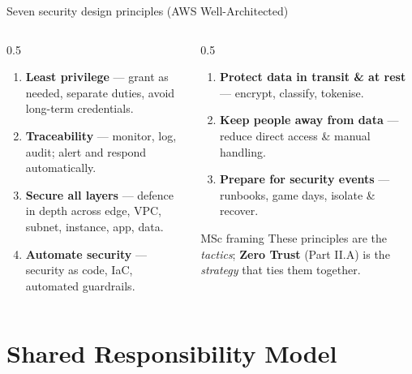 \documentclass[aspectratio=169,10pt]{beamer}
\newcommand{\term}[1]{{\color{awsink}\textbf{#1}}}
\begin{document}
\begin{frame}{Seven security design principles (AWS Well-Architected)}
  \footnotesize
  \begin{columns}[T]
    \begin{column}{0.5\textwidth}
      \begin{enumerate}\setlength\itemsep{2pt}
        \item \term{Least privilege} --- grant as needed, separate duties, avoid long-term credentials.
        \item \term{Traceability} --- monitor, log, audit; alert and respond automatically.
        \item \term{Secure all layers} --- defence in depth across edge, VPC, subnet, instance, app, data.
        \item \term{Automate security} --- security as code, IaC, automated guardrails.
      \end{enumerate}
    \end{column}
    \begin{column}{0.5\textwidth}
      \begin{enumerate}\setlength\itemsep{2pt}\setcounter{enumi}{4}
        \item \term{Protect data in transit \& at rest} --- encrypt, classify, tokenise.
        \item \term{Keep people away from data} --- reduce direct access \& manual handling.
        \item \term{Prepare for security events} --- runbooks, game days, isolate \& recover.
      \end{enumerate}
      \vspace{0.5em}
      \begin{block}{\footnotesize MSc framing}
        \footnotesize These principles are the \emph{tactics}; \term{Zero Trust} (Part II.A) is the
        \emph{strategy} that ties them together.
      \end{block}
    \end{column}
  \end{columns}
\end{frame}

\section{Shared Responsibility Model}
\end{document}
